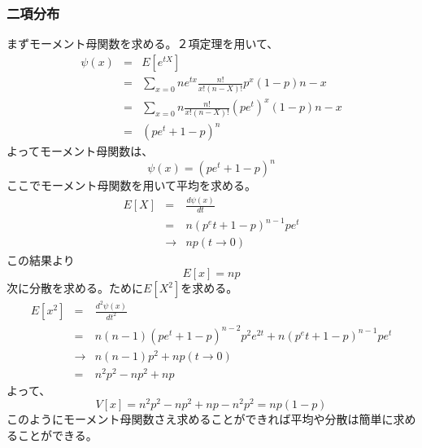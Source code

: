 \documentclass[a4paper,10pt]{jarticle}
\begin{document}
\subsubsection{二項分布}
まずモーメント母関数を求める。２項定理を用いて、
\begin{eqnarray*}
    \psi(x) &=& E[e^{tX}]\\
    &=& \sum_{x=0}{n} e^{tx}\frac{n!}{x!(n-X)!}p^x(1-p)n-x\\
    &=&\sum_{x=0}{n} \frac{n!}{x!(n-X)!}(pe^t)^x(1-p)n-x\\
    &=& (pe^t + 1 - p)^n
\end{eqnarray*}
よってモーメント母関数は、
\begin{equation}
    \psi(x) =(pe^t + 1 - p)^n\tag{3,27}
\end{equation}
ここでモーメント母関数を用いて平均を求める。
\begin{eqnarray*}
    E[X] &=& \frac{d\psi(x)}{dt}\\
    &=& n(p^et + 1 -p)^{n-1}pe^t\\
    &\rightarrow& np(t\rightarrow 0)
\end{eqnarray*}
この結果より
\begin{equation}
    E[x] = np \tag{3,28}
\end{equation}
次に分散を求める。ために$E[X^2]$を求める。
\begin{eqnarray*}
    E[x^2] &=& \frac{d^2\psi(x)}{dt^2}\\
           &=& n(n-1)(pe^t+1-p)^{n-2}p^2e^{2t}+n(p^et + 1 -p)^{n-1}pe^t\\
           &\rightarrow& n(n-1)p^2+np(t\rightarrow 0)\\
           &=& n^2p^2-np^2+np
\end{eqnarray*}
よって、
\begin{equation}
    V[x]= n^2p^2-np^2+np -n^2p^2=np(1-p)\tag{3,29}
\end{equation}
このようにモーメント母関数さえ求めることができれば平均や分散は簡単に求めることができる。
\end{document}
